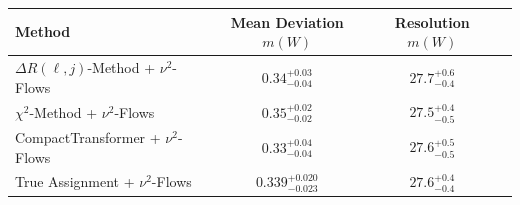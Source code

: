     \begin{tabular}{lccc}
        \toprule
        Method & Mean Deviation $m(W)$ & Resolution $m(W)$ \\
        \midrule
        $\Delta R(\ell,j)$-Method + $\nu^2$-Flows & $0.34^{+0.03}_{-0.04}$ & $27.7^{+0.6}_{-0.4}$ \\
        $\chi^2$-Method + $\nu^2$-Flows & $0.35^{+0.02}_{-0.02}$ & $27.5^{+0.4}_{-0.5}$ \\
        CompactTransformer + $\nu^2$-Flows & $0.33^{+0.04}_{-0.04}$ & $27.6^{+0.5}_{-0.5}$ \\
        True Assignment + $\nu^2$-Flows & $0.339^{+0.020}_{-0.023}$ & $27.6^{+0.4}_{-0.4}$ \\
        \bottomrule
    \end{tabular}
